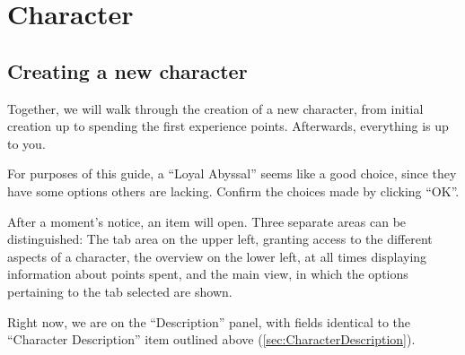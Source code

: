 \section{Character}

\subsection{Creating a new character}
Together, we will walk through the creation of a new character, from initial creation up to spending the first experience points. Afterwards, everything is up to you.

For purposes of this guide, a ``Loyal Abyssal'' seems like a good choice, since they have some options others are lacking. Confirm the choices made by clicking ``OK''.

After a moment's notice, an item will open.
Three separate areas can be distinguished: The tab area on the upper left, granting access to the different aspects of a character, the overview on the lower left, at all times displaying information about points spent, and the main view, in which the options pertaining to the tab selected are shown.

Right now, we are on the ``Description'' panel, with fields identical to the ``Character Description'' item outlined above (\ref{sec:CharacterDescription}).

